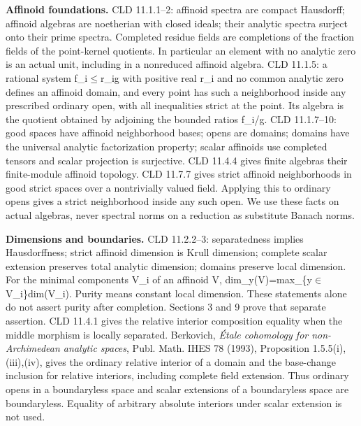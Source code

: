 \documentclass[
  10pt,
]{article}
\begin{document}
\textbf{Affinoid foundations.} CLD 11.1.1--2: affinoid spectra are
compact Hausdorff; affinoid algebras are noetherian with closed ideals;
their analytic spectra surject onto their prime spectra. Completed
residue fields are completions of the fraction fields of the
point-kernel quotients. In particular an element with no analytic zero
is an actual unit, including in a nonreduced affinoid algebra. CLD
11.1.5: a rational system \textbar f\_i\textbar\ensuremath{\le}r\_i\textbar g\textbar{}
with positive real r\_i and no common analytic zero defines an affinoid
domain, and every point has such a neighborhood inside any prescribed
ordinary open, with all inequalities strict at the point. Its algebra is
the quotient obtained by adjoining the bounded ratios f\_i/g. CLD
11.1.7--10: good spaces have affinoid neighborhood bases; opens are
domains; domains have the universal analytic factorization property;
scalar affinoids use completed tensors and scalar projection is
surjective. CLD 11.4.4 gives finite algebras their finite-module
affinoid topology. CLD 11.7.7 gives strict affinoid neighborhoods in
good strict spaces over a nontrivially valued field. Applying this to
ordinary opens gives a strict neighborhood inside any such open. We use
these facts on actual algebras, never spectral norms on a reduction as
substitute Banach norms.

\textbf{Dimensions and boundaries.} CLD 11.2.2--3: separatedness implies
Hausdorffness; strict affinoid dimension is Krull dimension; complete
scalar extension preserves total analytic dimension; domains preserve
local dimension. For the minimal components V\_i of an affinoid V,
dim\_y(V)=max\_\{y\ensuremath{\in}V\_i\}dim(V\_i). Purity means constant local
dimension. These statements alone do not assert purity after completion.
Sections 3 and 9 prove that separate assertion. CLD 11.4.1 gives the
relative interior composition equality when the middle morphism is
locally separated. Berkovich, \emph{Étale cohomology for non-Archimedean
analytic spaces}, Publ. Math. IHES 78 (1993), Proposition
1.5.5(i),(iii),(iv), gives the ordinary relative interior of a domain
and the base-change inclusion for relative interiors, including complete
field extension. Thus ordinary opens in a boundaryless space and scalar
extensions of a boundaryless space are boundaryless. Equality of
arbitrary absolute interiors under scalar extension is not used.
\end{document}
